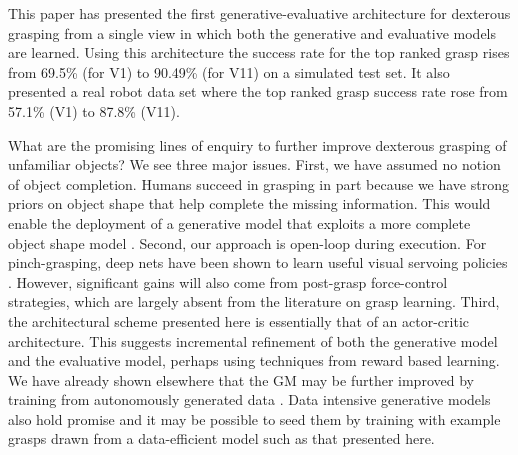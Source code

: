 This paper has presented the first generative-evaluative architecture for dexterous grasping from a single view in which both the generative and evaluative models are learned. Using this architecture the success rate for the top ranked grasp rises from 69.5\% (for V1) to 90.49\% (for V11) on a simulated test set. It also presented a real robot data set where the top ranked grasp success rate rose from 57.1\% (V1) to 87.8\% (V11).

What are the promising lines of enquiry to further improve dexterous grasping of unfamiliar objects? We see three major issues. First, we have assumed no notion of object completion. Humans succeed in grasping in part because we have strong priors on object shape that help complete the missing information. This would enable the deployment of a generative model that exploits a more complete object shape model \cite{kopicki2015ijrr}. Second, our approach is open-loop during execution. For pinch-grasping, deep nets have been shown to learn useful visual servoing policies \cite{morrison18}. However, significant gains will also come from post-grasp force-control strategies, which are largely absent from the literature on grasp learning.  Third, the architectural scheme presented here is essentially that of an actor-critic architecture. This suggests incremental refinement of both the generative model and the evaluative model, perhaps using techniques from reward based learning. We have already shown elsewhere that the GM may be further improved by training from autonomously generated data \cite{kopicki2019ijrr}. Data intensive generative models also hold promise \cite{veres2017modeling} and it may be possible to seed them by training with example grasps drawn from a data-efficient model such as that presented here.